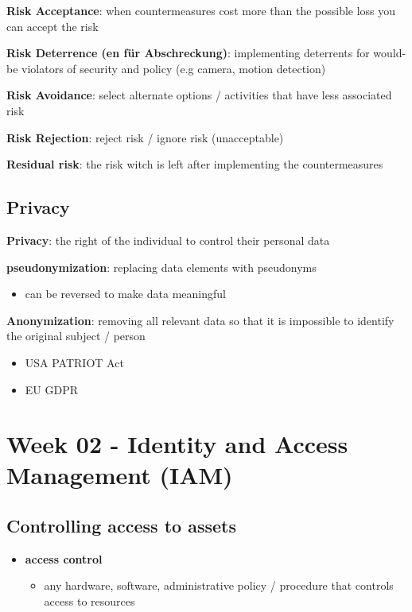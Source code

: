 \documentclass[11pt,twoside,landscape]{article}
\begin{document}
\begin{multicols}{4}
\textbf{Risk Acceptance}: when countermeasures cost more than the possible loss you can accept the risk

\textbf{Risk Deterrence (en für Abschreckung)}: implementing deterrents for would-be violators of security and policy (e.g camera, motion detection)

\textbf{Risk Avoidance}: select alternate options / activities that have less associated risk

\textbf{Risk Rejection}: reject risk / ignore risk (unacceptable)

\textbf{Residual risk}: the risk witch is left after implementing the countermeasures

\subsection*{Privacy}
\label{sec:org0f1f630}
\textbf{Privacy}: the right of the individual to control their personal data

\textbf{pseudonymization}: replacing data elements with pseudonyms
\begin{itemize}
\item can be reversed to make data meaningful
\end{itemize}

\textbf{Anonymization}: removing all relevant data so that it is impossible to identify the original subject / person

\begin{itemize}
\item USA PATRIOT Act
\item EU GDPR
\end{itemize}

\section*{Week 02 - Identity and Access Management (IAM)}
\label{sec:org6534fd0}
\subsection*{Controlling access to assets}
\label{sec:org72d5a8e}
\begin{itemize}
\item \textbf{access control}
\begin{itemize}
\item any hardware, software, administrative policy / procedure that controls access to resources
\end{itemize}


\end{itemize}
\end{multicols}
\end{document}

